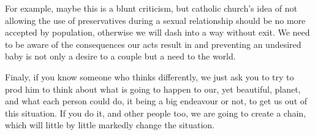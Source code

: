\documentclass[a4paper,12pt]{article}
\begin{document}
For example, maybe this is a {\color{red}blunt} criticism, but catholic church's idea of not allowing
the use of preservatives during a sexual relationship should be no more accepted
by  population,   otherwise  we  will  {\color{red}dash}  into   a  way  without
exit. We need to be aware of the consequences our acts result in and preventing
an undesired baby is not only a desire to a couple but a need to the world.

Finaly, if you know someone who thinks differently, we just ask you to try to {\color{red}prod} him
to think about what  is going to happen to our, yet  beautiful, planet, and what
each person could do, it being a big {\color{red}endeavour} or not, to get us out of this situation.
If you do it, and other people too, we are going to create a chain, which will
little by  little {\color{red}markedly} change the situation.  
\end{document}
